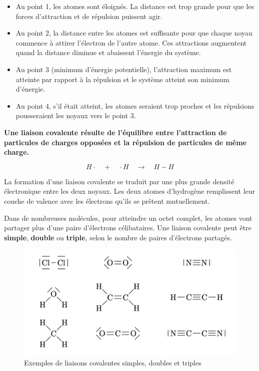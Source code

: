 \documentclass[
  11pt,
  french,
  a4paper,
  openany]{book}
\providecommand{\tightlist}{%
  \setlength{\itemsep}{0pt}\setlength{\parskip}{0pt}}
\begin{document}
\begin{itemize}
\tightlist
\item
  Au point 1, les atomes sont éloignés. La distance est trop grande pour que les forces d'attraction et de répulsion puissent agir.
\item
  Au point 2, la distance entre les atomes est suffisante pour que chaque noyau commence à attirer l'électron de l'autre atome. Ces attractions augmentent quand la distance diminue et abaissent l'énergie du système.
\item
  Au point 3 (minimum d'énergie potentielle), l'attraction maximum est atteinte par rapport à la répulsion et le système atteint son minimum d'énergie.
\item
  Au point 4, s'il était atteint, les atomes seraient trop proches et les répulsions pousseraient les noyaux vers le point 3.
\end{itemize}

\textbf{Une liaison covalente résulte de l'équilibre entre l'attraction de particules de charges opposées et la répulsion de particules de même charge.}

\[ H \cdot \quad + \quad \cdot H \quad \longrightarrow \quad H-H \]

La formation d'une liaison covalente se traduit par une plus grande densité électronique entre les deux noyaux. Les deux atomes d'hydrogène remplissent leur couche de valence avec les électrons qu'ils se prêtent mutuellement.

Dans de nombreuses molécules, pour atteindre un octet complet, les atomes vont partager plus d'une paire d'électrons célibataires. Une liaison covalente peut être \textbf{simple}, \textbf{double} ou \textbf{triple}, selon le nombre de paires d'électrons partagés.

\begin{figure}

{\centering \includegraphics[width=0.67\linewidth]{images/liaisons-multiples} 

}

\caption{Exemples de liaisons covalentes simples, doubles et triples}\label{fig:liaisons-multiples}
\end{figure}
\end{document}
